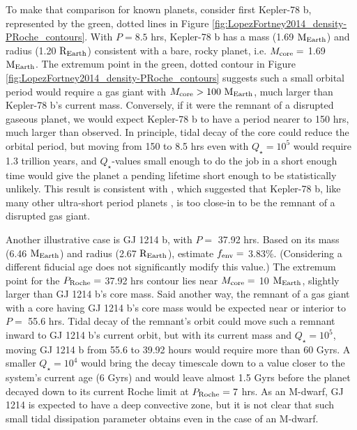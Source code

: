 \documentclass{svjour3}                     %
\begin{document}
To make that comparison for known planets, consider first Kepler-78 b, represented by the green, dotted lines in Figure \ref{fig:LopezFortney2014_density-PRoche_contours}. With $P = 8.5$ hrs, Kepler-78 b has a mass (1.69 ${\rm M_{Earth}}$) and radius (1.20 ${\rm R_{Earth}}$) consistent with a bare, rocky planet, i.e. $M_{\rm core} =$ 1.69 ${\rm M_{Earth}}$. The extremum point in the green, dotted contour in Figure \ref{fig:LopezFortney2014_density-PRoche_contours} suggests such a small orbital period would require a gas giant with $M_{\rm core} > 100\ {\rm M_{Earth}}$, much larger than Kepler-78 b's current mass. Conversely, if it were the remnant of a disrupted gaseous planet, we would expect Kepler-78 b to have a period nearer to 150 hrs, much larger than observed. In principle, tidal decay of the core could reduce the orbital period, but moving from 150 to 8.5 hrs even with $Q_\star = 10^5$ would require 1.3 trillion years, and $Q_\star$-values small enough to do the job in a short enough time would give the planet a pending lifetime short enough to be statistically unlikely. This result is consistent with \cite{2015ApJ...813..101V}, which suggested that Kepler-78 b, like many other ultra-short period planets \cite{2014ApJ...787...47S}, is too close-in to be the remnant of a disrupted gas giant.

Another illustrative case is GJ 1214 b, with $P =$ 37.92 hrs. Based on its mass (6.46 ${\rm M_{Earth}}$) and radius (2.67 ${\rm R_{Earth}}$), \cite{Lopez2014Understanding} estimate $f_{\rm env} =$ 3.83\%. (Considering a different fiducial age does not significantly modify this value.) The extremum point for the $P_{\rm Roche} =$ 37.92 hrs contour lies near $M_{\rm core} =$ 10 ${\rm M_{Earth}}$, slightly larger than GJ 1214 b's core mass. Said another way, the remnant of a gas giant with a core having GJ 1214 b's core mass would be expected near or interior to $P =$ 55.6 hrs. Tidal decay of the remnant's orbit could move such a remnant inward to GJ 1214 b's current orbit, but with its current mass and $Q_\star = 10^5$, moving GJ 1214 b from 55.6 to 39.92 hours would require more than 60 Gyrs. A smaller $Q_\star = 10^4$ would bring the decay timescale down to a value closer to the system's current age (6 Gyrs) and would leave almost 1.5 Gyrs before the planet decayed down to its current Roche limit at $P_{\rm Roche} = 7$ hrs. As an M-dwarf, GJ 1214 is expected to have a deep convective zone, but it is not clear that such small tidal dissipation parameter obtains even in the case of an M-dwarf.
\end{document}
